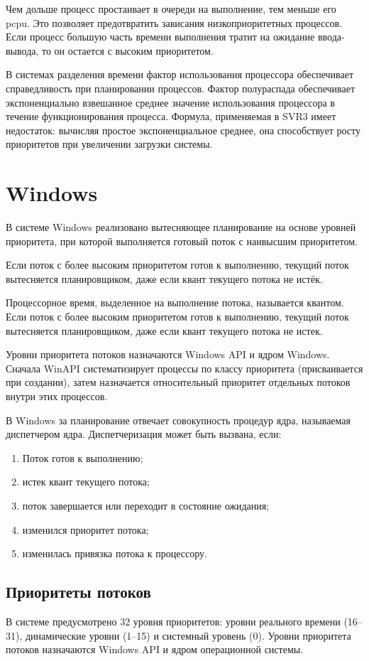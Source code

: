 \documentclass[12pt]{report}
\begin{document}
Чем дольше процесс простаивает в очереди на выполнение, тем меньше его p\textunderscore cpu. Это позволяет предотвратить зависания низкоприоритетных процессов. Если процесс большую часть времени выполнения тратит на ожидание ввода-вывода, то он остается с высоким приоритетом.

В системах разделения времени фактор использования процессора обеспечивает справедливость при планировании процессов. Фактор полураспада обеспечивает экспоненциально взвешанное среднее значение использования процессора в течение функционирования процесса. Формула, применяемая в SVR3 имеет недостаток: вычисляя простое экспоненциальное среднее, она способствует росту приоритетов при увеличении загрузки системы.
\section{Windows}
В системе Windows реализовано вытесняющее планирование на основе уровней приоритета, при которой выполняется готовый поток с наивысшим приоритетом.

Если поток с более высоким приоритетом готов к выполнению, текущий поток вытесняется планировщиком, даже если квант текущего потока не истёк.

Процессорное время, выделенное на выполнение потока, называется квантом. Если поток с более высоким приоритетом готов к выполнению, текущий поток вытесняется планировщиком, даже если квант текущего потока не истек.

Уровни приоритета потоков назначаются Windows API и ядром Windows. Сначала WinAPI систематизирует процессы по классу приоритета (присваивается при создании), затем назначается относительный приоритет отдельных потоков внутри этих процессов.

\newpage
В Windows за планирование отвечает совокупность процедур ядра, называемая диспетчером ядра. Диспетчеризация может быть вызвана, если:
\begin{enumerate}
	\item Поток готов к выполнению;
	\item истек квант текущего потока;
	\item поток завершается или переходит в состояние ожидания;
	\item изменился приоритет потока;
	\item изменилась привязка потока к процессору.
\end{enumerate}
\subsection{Приоритеты потоков}
В системе предусмотрено 32 уровня приоритетов: уровни реального времени (16–31), динамические уровни (1–15) и системный уровень (0).
Уровни приоритета потоков назначаются Windows API и ядром операционной системы.
\end{document}
